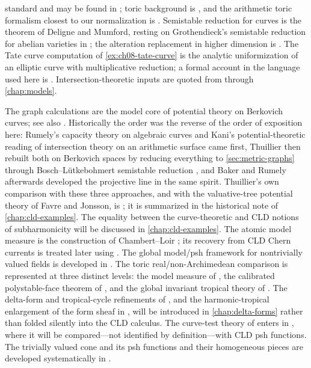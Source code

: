 standard and may be found in \cite{Roc70,Sch14}; toric background is
\cite{Fultor,CLS11}, and the arithmetic toric formalism closest to our
normalization is \cite{BGPS14}.  Semistable reduction for curves is the
theorem of Deligne and Mumford, resting on Grothendieck's semistable
reduction for abelian varieties in \cite{SGA7I}; the alteration replacement
in higher dimension is \cite{deJong1996}.  The Tate curve computation of
\cref{ex:ch08-tate-curve} is the analytic uniformization of an elliptic curve
with multiplicative reduction; a formal account in the language used here is
\cite{BoschLutkebohmert1993}.  Intersection-theoretic inputs are quoted from
\cite{Ful} through \cref{chap:models}.

The graph calculations are the model core of potential theory on Berkovich
curves; see also \cite{Berk12}.  Historically the order was the reverse of
the order of exposition here: Rumely's capacity theory on algebraic curves
and Kani's potential-theoretic reading of intersection theory on an
arithmetic surface came first, Thuillier \cite{Thu05} then rebuilt both on
Berkovich spaces by reducing everything to \cref{sec:metric-graphs} through
Bosch--L\"utkebohmert semistable reduction \cite[Thm.~2.3.8]{Thu05}, and
Baker and Rumely afterwards developed the projective line in the same spirit.
Thuillier's own comparison with these three approaches, and with the
valuative-tree potential theory of Favre and Jonsson, is
\cite[\S\S5.1--5.4]{Thu05}; it is summarized in the historical note of
\cref{chap:cld-examples}.  The equality between the curve-theoretic and
CLD notions of
subharmonicity will be discussed in \cref{chap:cld-examples}.  The atomic model measure is
the construction of Chambert--Loir \cite{CL06}; its recovery from CLD Chern
currents is treated later using \cite{CLD12}.  The global model/psh framework
for nontrivially valued fields is developed in \cite{BFJ16}.  The toric
real/non-Archimedean comparison is represented at three distinct levels:
the model measure of \cite{CL06}, the calibrated polystable-face theorem of
\cite{Vil20}, and the global invariant tropical theory of \cite{BGJKK25}.
The delta-form and tropical-cycle refinements of \cite{GK17,GK19}, and the
harmonic-tropical enlargement of the form sheaf in \cite{GJR26}, will be
introduced in \cref{chap:delta-forms} rather than folded silently into the CLD calculus.
The curve-test theory of \cite{GR25PL,GR25Classical} enters in
, where it will be
compared---not identified by
definition---with CLD psh functions.  The trivially valued cone and its
psh functions and their homogeneous pieces are developed systematically in \cite{BJ22}.
